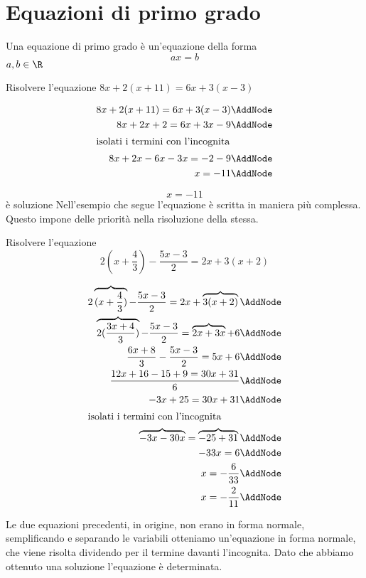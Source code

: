 \section{Equazioni di primo grado}
\label{sec:equazionidiprimogrado}
\begin{definizionet}{}{}
Una equazione di primo grado è un'equazione della forma \[ax=b\]
$a,b\in\R$
\end{definizionet}
\begin{esempiot}{}{}
Risolvere l'equazione $8x+2(x+11) = 6x+3(x-3) $
\end{esempiot}
 \begin{NodesList}[margin=3cm]
  \begin{align*}
  8x+2(x+11) = 6x+3(x-3) \AddNode\\
  8x+2x+2  = 6x+3x-9 \AddNode\\
  \intertext{\hfil isolati i termini con l'incognita \hfil}
  8x+2x-6x-3x  = -2-9 \AddNode\\
    x  = -11 \AddNode
  \end{align*}
  \LinkNodes{ }
  \end{NodesList}
  \[x=-11\]
  è soluzione
Nell'esempio che segue l'equazione è scritta in maniera più complessa. Questo impone delle priorità nella risoluzione della stessa. 
\begin{esempiot}{}{}
Risolvere l'equazione \[2(x+\dfrac{4}{3})-\dfrac{5x-3}{2}=2x+3(x+2) \]
\end{esempiot}
 \begin{NodesList}[margin=3cm]
  \begin{align*}
  2\overbrace{(x+\dfrac{4}{3})}-\dfrac{5x-3}{2}=2x+\overbrace{3(x+2)} \AddNode\\
\overbrace{2(\dfrac{3x+4}{3})}-\dfrac{5x-3}{2}=\overbrace{2x+3x}+6 \AddNode\\
  \dfrac{6x+8}{3}-\dfrac{5x-3}{2}=5x+6   \AddNode\\
 \dfrac{12x+16-15+9=30x+31}{6}   \AddNode\\
 -3x+25=30x+31\AddNode\\
  \intertext{\hfil isolati i termini con l'incognita \hfil}
 \overbrace{-3x-30x}=\overbrace{-25+31}\AddNode\\
 -33x=6\AddNode\\
 x=-\dfrac{6}{33}\AddNode\\
 x=-\dfrac{2}{11}\AddNode\\
  \end{align*}
  \end{NodesList}
Le due equazioni precedenti, in origine, non erano in forma normale, semplificando e separando le variabili otteniamo un'equazione in forma normale,  che viene risolta dividendo per il termine davanti l'incognita. Dato che abbiamo ottenuto una soluzione l'equazione è determinata.
 
